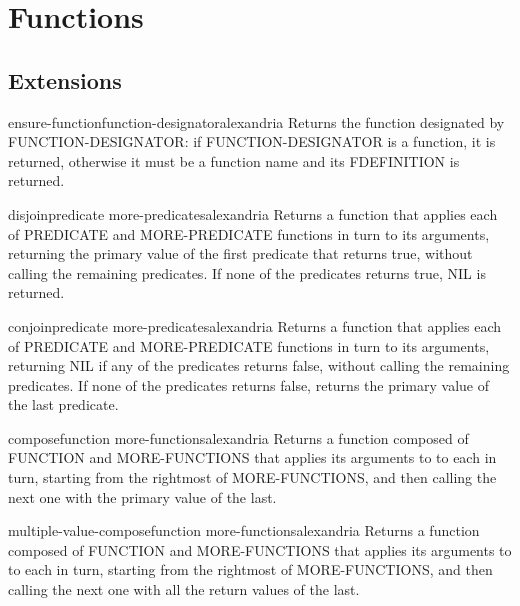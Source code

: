 \chapter{Functions}

\section{Extensions}
\label{sec:fun-extensions}

\begin{function}{ensure-function}{function-designator}{alexandria}{}
  Returns the function designated by FUNCTION-DESIGNATOR:
if FUNCTION-DESIGNATOR is a function, it is returned, otherwise
it must be a function name and its FDEFINITION is returned.
\end{function}

\begin{function}{disjoin}{predicate \rest more-predicates}{alexandria}{}
  Returns a function that applies each of PREDICATE and MORE-PREDICATE
functions in turn to its arguments, returning the primary value of the first
predicate that returns true, without calling the remaining predicates.
If none of the predicates returns true, NIL is returned.
\end{function}

\begin{function}{conjoin}{predicate \rest more-predicates}{alexandria}{}
  Returns a function that applies each of PREDICATE and MORE-PREDICATE
functions in turn to its arguments, returning NIL if any of the predicates
returns false, without calling the remaining predicates. If none of the
predicates returns false, returns the primary value of the last predicate.
\end{function}

\begin{function}{compose}{function \rest more-functions}{alexandria}{}
  Returns a function composed of FUNCTION and MORE-FUNCTIONS that applies its
arguments to to each in turn, starting from the rightmost of MORE-FUNCTIONS,
and then calling the next one with the primary value of the last.
\end{function}

\begin{function}{multiple-value-compose}{function \rest more-functions}{alexandria}{}
  Returns a function composed of FUNCTION and MORE-FUNCTIONS that applies
its arguments to to each in turn, starting from the rightmost of
MORE-FUNCTIONS, and then calling the next one with all the return values of
the last.
\end{function}

